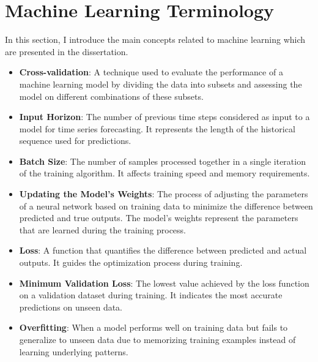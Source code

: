 
\section{Machine Learning Terminology}
\label{terminologies_appendix}
In this section, I introduce the main concepts related to machine learning which are presented in the dissertation.

\begin{itemize}
    \item \textbf{Cross-validation}: A technique used to evaluate the performance of a machine learning model by dividing the data into subsets and assessing the model on different combinations of these subsets.

    \item \textbf{Input Horizon}: The number of previous time steps considered as input to a model for time series forecasting. It represents the length of the historical sequence used for predictions.
    
    \item \textbf{Batch Size}: The number of samples processed together in a single iteration of the training algorithm. It affects training speed and memory requirements.
    
    \item \textbf{Updating the Model's Weights}: The process of adjusting the parameters of a neural network based on training data to minimize the difference between predicted and true outputs. The model's weights represent the parameters that are learned during the training process.
    
    \item \textbf{Loss}: A function that quantifies the difference between predicted and actual outputs. It guides the optimization process during training.
    
    \item \textbf{Minimum Validation Loss}: The lowest value achieved by the loss function on a validation dataset during training. It indicates the most accurate predictions on unseen data.
    
    \item \textbf{Overfitting}: When a model performs well on training data but fails to generalize to unseen data due to memorizing training examples instead of learning underlying patterns.
    

\end{itemize}
